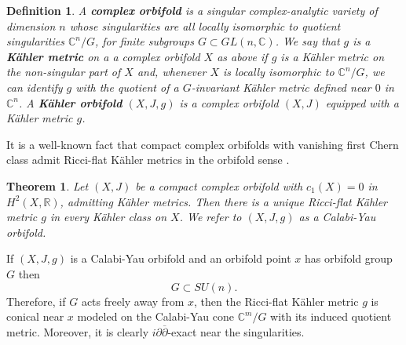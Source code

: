 \documentclass[a4paper,11pt]{article}
\newcounter{mythm}[section]
\newtheorem{tm}[mythm]{Theorem}
\newtheorem{defi}[mythm]{Definition}
\def\C{\mathbb{C}}
\def\R{\mathbb{R}}
\begin{document}
\begin{defi}
    A \textbf{complex orbifold } is a singular complex-analytic variety of dimension $n$ whose singularities are all locally isomorphic to quotient singularities $\C^n / G$, for finite subgroups $G \subset GL(n, \C)$. We say that $g$ is a \textbf{Kähler metric} on a a complex orbifold $X$ as above if $g$ is a Kähler metric on the non-singular part of $X$ and, whenever $X$ is locally isomorphic to $\C^n / G$, we can identify $g$ with the quotient of a $G$-invariant Kähler metric defined near $0$ in $\C^n$. A \textbf{Kähler orbifold} $(X, J, g)$ is a complex orbifold $(X,J)$ equipped with a Kähler metric $g$.
\end{defi}

It is a well-known fact that compact complex orbifolds with vanishing first Chern class admit Ricci-flat Kähler metrics in the orbifold sense \cite[Theorem 6.5.6]{joyce2000compact}.

\begin{tm} \label{conorbifold}
    Let $(X, J)$ be a compact complex orbifold with $c_1(X) =0 $ in $H^2(X, \R)$, admitting Kähler metrics. Then there is a unique Ricci-flat Kähler metric $g$ in every Kähler class on $X$. We refer to $(X, J, g)$ as a \emph{Calabi-Yau orbifold}.
\end{tm}

If $(X,J,g)$ is a Calabi-Yau orbifold and an orbifold point $x$ has orbifold group $G$ then 
$$
G \subset SU(n).
$$
Therefore, if $G$ acts freely away from $x$, then the Ricci-flat Kähler metric $g$ is conical near $x$ modeled on the Calabi-Yau cone $\C^m / G$ with its induced quotient metric. Moreover, it is clearly $i \partial \overline{\partial}$-exact near the singularities. \\
\end{document}
